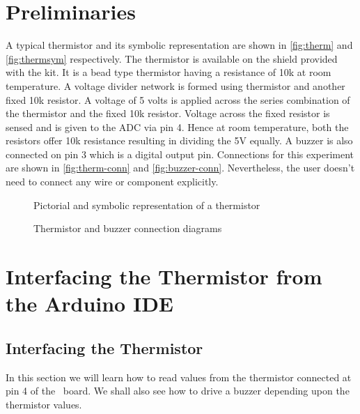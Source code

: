 \section{Preliminaries}
A typical thermistor and its symbolic representation are shown in
\ref{fig:therm} and \ref{fig:thermsym} respectively. The thermistor is
available on the shield provided with the kit.  It is a bead type
thermistor having a resistance of 10k at room temperature. A voltage
divider network is formed using thermistor and another fixed 10k
resistor. A voltage of 5 volts is applied across the series
combination of the thermistor and the fixed 10k resistor. Voltage
across the fixed resistor is sensed and is given to the ADC via pin
4. Hence at room temperature, both the resistors offer 10k resistance
resulting in dividing the 5V equally. A buzzer is also connected on
pin 3 which is a digital output pin.
Connections for this experiment are shown in \ref{fig:therm-conn}
and \ref{fig:buzzer-conn}.  Nevertheless, the user doesn't need to
connect any wire or component explicitly.


\begin{figure}
\centering
{} \hfill
{}
\caption{Pictorial and symbolic representation of a thermistor}
\end{figure}


\begin{figure}
\centering
{} \hfill
{}
\caption{Thermistor and buzzer connection diagrams}
\end{figure}

\section{Interfacing the Thermistor from the Arduino IDE}
\subsection{Interfacing the Thermistor}
In this section we will learn how to read values from the thermistor
connected at pin 4 of the \arduino\ board. We shall also see how to
drive a buzzer depending upon the thermistor values.

